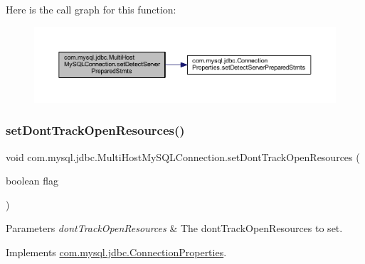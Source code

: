 Here is the call graph for this function\+:
\nopagebreak
\begin{figure}[H]
\begin{center}
\leavevmode
\includegraphics[width=350pt]{classcom_1_1mysql_1_1jdbc_1_1_multi_host_my_s_q_l_connection_a9bc00ee02ec2cb57883a27ac982ed215_cgraph}
\end{center}
\end{figure}
\mbox{\label{classcom_1_1mysql_1_1jdbc_1_1_multi_host_my_s_q_l_connection_a1a0edce81558c2e961ddf936a2410fe3}} 
\subsubsection{\texorpdfstring{set\+Dont\+Track\+Open\+Resources()}{setDontTrackOpenResources()}}
{\footnotesize\ttfamily void com.\+mysql.\+jdbc.\+Multi\+Host\+My\+S\+Q\+L\+Connection.\+set\+Dont\+Track\+Open\+Resources (\begin{DoxyParamCaption}\item[{boolean}]{flag }\end{DoxyParamCaption})}


\begin{DoxyParams}{Parameters}
{\em dont\+Track\+Open\+Resources} & The dont\+Track\+Open\+Resources to set. \\
\hline
\end{DoxyParams}


Implements \mbox{\hyperlink{interfacecom_1_1mysql_1_1jdbc_1_1_connection_properties_a71698dd42306aa0d570cda6344bc8680}{com.\+mysql.\+jdbc.\+Connection\+Properties}}.


